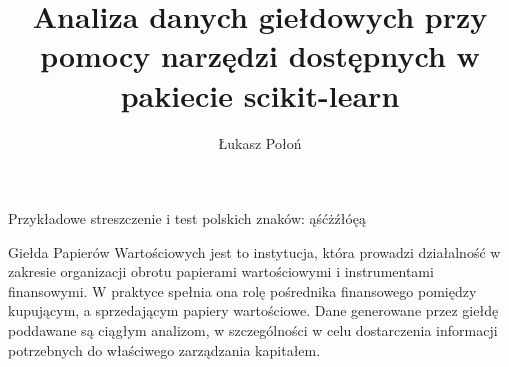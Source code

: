 \documentclass[man,mfi|min|mpt|mok|mub|mza|miz|bsp]{mgrwms}
\begin{document}
\title{Analiza danych giełdowych przy pomocy narzędzi dostępnych w pakiecie scikit-learn}
\author{Łukasz Połoń}
\maketitle
\tableofcontents
\begin{streszczenie}
Przykładowe streszczenie i test polskich znaków: ąśćżźłóęą

%
%
\end{streszczenie}
\begin{abstract}
%
%
\end{abstract}
\begin{wstep}[Wprowadzenie]  %
Giełda Papierów Wartościowych jest to instytucja, która prowadzi działalność w zakresie organizacji obrotu papierami wartościowymi i instrumentami finansowymi\cite{gpw}.
W praktyce spełnia ona rolę pośrednika finansowego pomiędzy kupującym, a sprzedającym papiery wartościowe.
Dane generowane przez giełdę poddawane są ciągłym analizom, w szczególności w celu dostarczenia informacji potrzebnych do właściwego zarządzania kapitałem.


\end{wstep}


%

%
\end{document}
